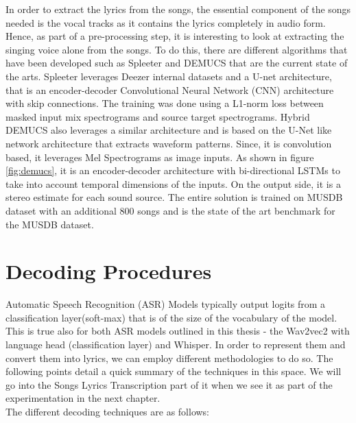 In order to extract the lyrics from the songs, the essential component of the songs needed is the vocal tracks as it contains the lyrics completely in audio form. Hence, as part of a pre-processing step, it is interesting to look at extracting the singing voice alone from the songs. To do this, there are different algorithms that have been developed such as Spleeter \cite{spleeter2020} and DEMUCS \cite{rouard2022hybrid} that are the current state of the arts. Spleeter leverages Deezer internal datasets and a U-net architecture, that is an encoder-decoder Convolutional Neural Network (CNN) architecture with skip connections. The training was done using a L1-norm loss between masked input mix spectrograms and source target spectrograms. Hybrid DEMUCS also leverages a similar architecture and is based on the U-Net like network architecture that extracts waveform patterns. Since, it is convolution based, it leverages Mel Spectrograms as image inputs. As shown in figure \ref{fig:demucs}, it is an encoder-decoder architecture with bi-directional LSTMs to take into account temporal dimensions of the inputs. On the output side, it is a stereo estimate for each sound source. The entire solution is trained on MUSDB dataset with an additional 800 songs and is the state of the art benchmark for the MUSDB dataset.



\section{Decoding Procedures}%
\label{sec:decoders}

Automatic Speech Recognition (ASR) Models typically output logits from a classification layer(soft-max) that is of the size of the vocabulary of the model. This is true also for both ASR models outlined in this thesis - the Wav2vec2 with language head (classification layer) and Whisper. In order to represent them and convert them into lyrics, we can employ different methodologies to do so. The following points detail a quick summary of the techniques in this space. We will go into the Songs Lyrics Transcription part of it when we see it as part of the experimentation in the next chapter. \\

The different decoding techniques are as follows:

